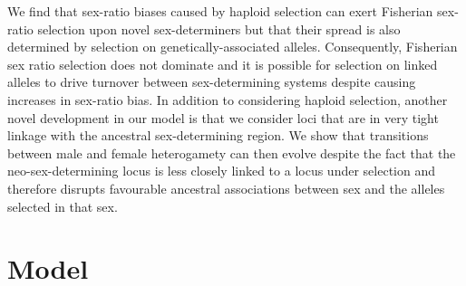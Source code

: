 \documentclass[12pt]{article}
\begin{document}
We find that sex-ratio biases caused by haploid selection can exert Fisherian sex-ratio selection upon novel sex-determiners but that their spread is also determined by selection on genetically-associated alleles. 
Consequently, Fisherian sex ratio selection does not dominate and it is possible for selection on linked alleles to drive turnover between sex-determining systems despite causing increases in sex-ratio bias. 
In addition to considering haploid selection, another novel development in our model is that we consider loci that are in very tight linkage with the ancestral sex-determining region.
We show that transitions between male and female heterogamety can then evolve despite the fact that the neo-sex-determining locus is less closely linked to a locus under selection and therefore disrupts favourable ancestral associations between sex and the alleles selected in that sex.

\section*{Model}
\end{document}
